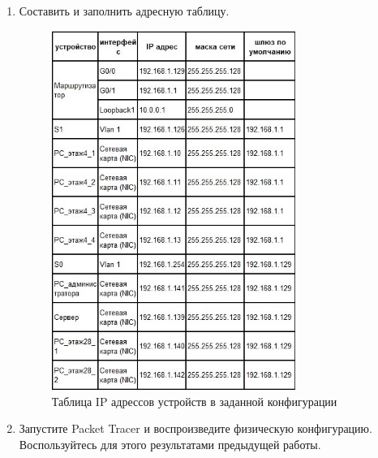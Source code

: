 \documentclass[bachelor, och, labwork]{shiza}
\begin{document}


\begin{enumerate}
    
    \item Составить и заполнить адресную таблицу.
    
    \begin{figure}[H]
        \centering      %
        \includegraphics[width=0.75\textwidth]{1}
        \caption{Таблица IP адрессов устройств в заданной конфигурации}
        \label{fig:image1}
    \end{figure}

    \item Запустите Packet Tracer и воспроизведите физическую конфигурацию. Воспользуйтесь для этого 
    результатами предыдущей работы.


\end{enumerate}
\end{document}
